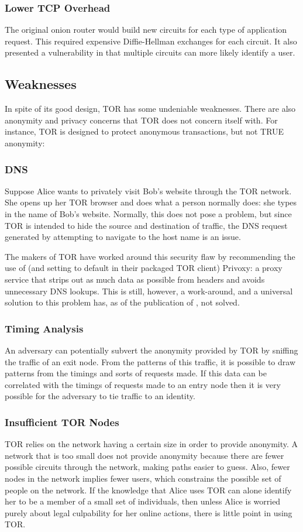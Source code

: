 \documentclass[letterpaper, titlepage, 12pt]{article}
\begin{document}
\subsubsection{Lower TCP Overhead}
The original onion router would build new circuits for each type of application request. This required expensive Diffie-Hellman exchanges for each circuit. It also presented a vulnerability in that multiple circuits can more likely identify a user\cite[p.~1]{whitepaper}.
\subsection{Weaknesses}
In spite of its good design, TOR has some undeniable weaknesses. There are also anonymity and privacy concerns that TOR does not concern itself with. For instance, TOR is designed to protect anonymous transactions, but not TRUE anonymity: 
\subsubsection{DNS}
Suppose Alice wants to privately visit Bob's website through the TOR network. She opens up her TOR browser and does what a person normally does: she types in the name of Bob's website. Normally, this does not pose a problem, but since TOR is intended to hide the source and destination of traffic, the DNS request generated by attempting to navigate to the host name is an issue\cite{whitepaper}.

The makers of TOR have worked around this security flaw by recommending the use of (and setting to default in their packaged TOR client) Privoxy: a proxy service that strips out as much data as possible from headers and avoids unnecessary DNS lookups. This is still, however, a work-around, and a universal solution to this problem has, as of the publication of \cite{whitepaper}, not solved.
\subsubsection{Timing Analysis}
An adversary can potentially subvert the anonymity provided by TOR by sniffing the traffic of an exit node. From the patterns of this traffic, it is possible to draw patterns from the timings and sorts of requests made.  If this data can be correlated with the timings of requests made to an entry node then it is very possible for the adversary to tie traffic to an identity.

\subsubsection{Insufficient TOR Nodes}
TOR relies on the network having a certain size in order to provide anonymity. A network that is too small does not provide anonymity because there are fewer possible circuits through the network, making paths easier to guess. Also, fewer nodes in the network implies fewer users, which constrains the possible set of people on the network. If the knowledge that Alice uses TOR can alone identify her to be a member of a small set of individuals, then unless Alice is worried purely about legal culpability for her online actions, there is little point in using TOR.
\end{document}
